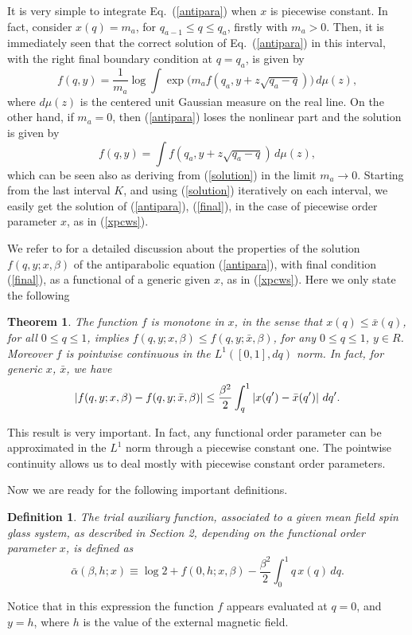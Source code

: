 \documentclass[a4paper,12pt]{article}
\newtheorem{theorem}{Theorem}
\newtheorem{definition}{Definition}
\begin{document}
It is very simple to integrate Eq.~(\ref{antipara}) when $x$ is piecewise 
constant. In fact, consider $x(q)=m_a$, for $q_{a-1}\le q \le q_{a}$, 
firstly with $m_a>0$. Then, 
it is immediately seen that the correct solution of Eq.~(\ref{antipara}) in 
this interval, with the right final boundary condition at $q = q_{a}$, is 
given by
\begin{equation}
\label{solution}
f(q,y)=\frac{1}{m_a}\log \int\exp\bigl({m_{a} f(q_a,y+z\sqrt{q_a-q})}\bigr)\,d\mu(z),
\end{equation}
where $d\mu(z)$ is the centered unit Gaussian measure on the real line. On 
the other hand, if $m_a=0$, then (\ref{antipara}) loses the nonlinear part 
and the solution is given by
\begin{equation}
\label{solution0}
f(q,y)= \int f(q_a,y+z\sqrt{q_a-q})\,d\mu(z),
\end{equation}
which can be seen also as deriving from (\ref{solution}) in the limit $m_a \to 0$.
Starting from the last interval $K$, and using (\ref{solution}) iteratively on 
each interval, we easily get the solution of (\ref{antipara}), 
(\ref{final}), in the case of piecewise order parameter $x$, as in
(\ref{xpcws}).

We refer to \cite{Greview} for a detailed discussion about 
the properties of the solution
$f(q,y;x,\beta)$
of the antiparabolic equation (\ref{antipara}), with final condition 
(\ref{final}), as a
functional of a generic given $x$, as in (\ref{xpcws}). Here we only state 
the following
\begin{theorem}
The function $f$ is monotone in $x$, in the sense that 
$x(q)\le{\bar x}(q)$, for all $0\le q\le1$, implies 
$f(q,y;x,\beta)\le f(q,y;{\bar x},\beta)$, for any $0\le q\le1$, $y\in R$. 
Moreover $f$
is pointwise continuous in the $L^1([0,1],dq)$ norm. 
In fact, for generic $x$, $\bar x$, we
have    
$$|f(q,y;x,\beta)-f(q,y;{\bar x},\beta)|\le
{\beta^2\over2}\int^1_q|x(q')-{\bar x}(q')|\ dq'.
$$
\end{theorem}
This result is very important. In fact, any functional order parameter can 
be approximated in the $L^1$ norm through a piecewise constant one. The 
pointwise continuity allows us to deal mostly with piecewise constant order 
parameters.

Now we are ready for the following important definitions.
\begin{definition}
The trial auxiliary function, associated to a given mean field spin glass 
system, as described in Section 2, depending on the functional order 
parameter $x$, is defined as
\begin{equation}\label{trial}
\bar\alpha(\beta,h;x)\equiv \log 2 + 
f(0,h;x,\beta)-\frac{\beta^2}{2}\int_{0}^{1} 
q\, x(q)\,dq.
\end{equation}
\end{definition}
Notice that in this expression the function $f$ appears evaluated at $q=0$, 
and $y=h$, where $h$ is the value of the external magnetic field.
\end{document}
